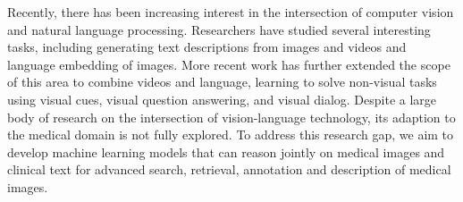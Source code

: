 Recently, there has been increasing interest in the intersection of computer vision and natural language processing. Researchers have studied several interesting tasks, including generating text descriptions from images and videos and language embedding of images. More recent work has further extended the scope of this area to combine videos and language, learning to solve non-visual tasks using visual cues, visual question answering, and visual dialog. Despite a large body of research on the intersection of vision-language technology, its adaption to the medical domain is not fully explored. To address this research gap, we aim to develop machine learning models that can reason jointly on medical images and clinical text for advanced search, retrieval, annotation and description of medical images.
